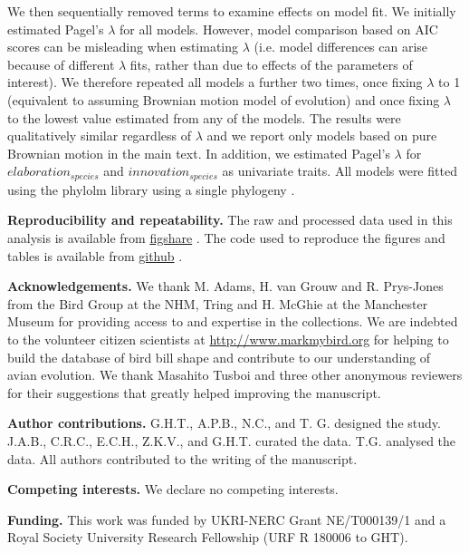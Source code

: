 \documentclass[12pt,letterpaper]{article}
\begin{document}
We then sequentially removed terms to examine effects on model fit.
We initially estimated Pagel's $\lambda$ \cite{pagel1997inferring} for all models.
However, model comparison based on AIC scores can be misleading when estimating $\lambda$ (i.e. model differences can arise because of different $\lambda$ fits, rather than due to effects of the parameters of interest).
We therefore repeated all models a further two times, once fixing $\lambda$ to 1 (equivalent to assuming Brownian motion model of evolution) and once fixing $\lambda$ to the lowest value estimated from any of the models.
The results were qualitatively similar regardless of $\lambda$ and we report only models based on pure Brownian motion in the main text.
In addition, we estimated Pagel’s $\lambda$ for $elaboration_{species}$ and $innovation_{species}$ as univariate traits.
All models were fitted using the phylolm library using a single phylogeny \cite{phylom}.

\textbf{Reproducibility and repeatability.}
The raw and processed data used in this analysis is available from \href{https://figshare.com/articles/dataset/Innovation_and_elaboration_on_the_avian_tree_of_life/20480355}{figshare} \cite{fighsaredata}.
The code used to reproduce the figures and tables is available from \href{https://github.com/TGuillerme/elaboration_exploration_bird_beaks}{github} \cite{githubrepo}.

\textbf{Acknowledgements.}
We thank M. Adams, H. van Grouw and R. Prys-Jones from the Bird Group at the NHM, Tring and H. McGhie at the Manchester Museum for providing access to and expertise in the collections.
We are indebted to the volunteer citizen scientists at \url{http://www.markmybird.org} for helping to build the database of bird bill shape and contribute to our understanding of avian evolution. 
We thank Masahito Tusboi and three other anonymous reviewers for their suggestions that greatly helped improving the manuscript.

\textbf{Author contributions.} G.H.T., A.P.B., N.C., and T. G. designed the study. J.A.B., C.R.C., E.C.H., Z.K.V., and G.H.T. curated the data. T.G. analysed the data. All authors contributed to the writing of the manuscript.

\textbf{Competing interests.} We declare no competing interests.

\textbf{Funding.}
This work was funded by UKRI-NERC Grant NE/T000139/1 and a Royal Society University Research Fellowship (URF R 180006 to GHT).




\end{document}
